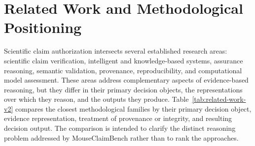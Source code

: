 \documentclass[11pt,a4paper]{article}
\begin{document}
\section{Related Work and Methodological Positioning}
\label{sec:related-work}

Scientific claim authorization intersects several established research areas:
scientific claim verification, intelligent and knowledge-based systems,
assurance reasoning, semantic validation, provenance, reproducibility, and
computational model assessment. These areas address complementary aspects of
evidence-based reasoning, but they differ in their primary decision objects,
the representations over which they reason, and the outputs they produce.
Table~\ref{tab:related-work-v2} compares the closest methodological families
by their primary decision object, evidence representation, treatment of
provenance or integrity, and resulting decision output. The comparison is
intended to clarify the distinct reasoning problem addressed by
MouseClaimBench rather than to rank the approaches.
\end{document}
